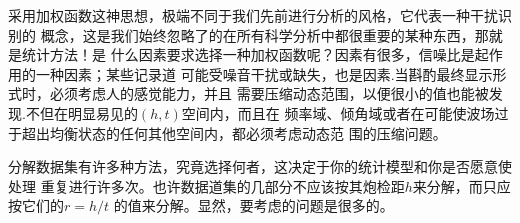采用加权函数这神思想，极端不同于我们先前进行分析的风格，它代表一种干扰识别的
概念，这是我们始终忽略了的在所有科学分析中都很重要的某种东西，那就是统计方法！是
什么因素要求选择一种加权函数呢？因素有很多，信噪比是起作用的一种因素；某些记录道
可能受噪音干扰或缺失，也是因素.当斟酌最终显示形式时，必须考虑人的感觉能力，并且
需要压缩动态范围，以便很小的值也能被发现.不但在明显易见的$(h,t)$空间内，而且在
频率域、倾角域或者在可能使波场过于超出均衡状态的任何其他空间内，都必须考虑动态范
围的压缩问题。

分解数据集有许多种方法，究竟选择何者，这决定于你的统计模型和你是否愿意使处理
重复进行许多次。也许数据道集的几部分不应该按其炮检距$h$来分解，而只应按它们的$r=h/t$
的值来分解。显然，要考虑的问题是很多的。







